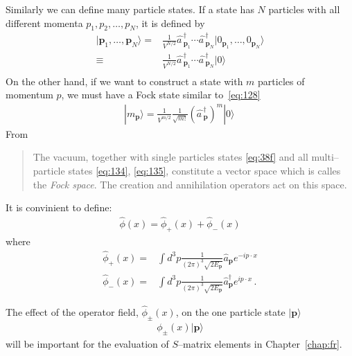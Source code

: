 Similarly we can define many particle states. If a state has $N$ particles with all different momenta $p_1,p_2,\ldots,p_N$, it is defined by
\begin{align}
  \label{eq:134}
  |\mathbf{p}_1,\ldots,\mathbf{p}_N\rangle=&\frac{1}{V^{N/2}}\widehat{a\,}_{\mathbf{p}_1}^\dagger\cdots
\widehat{a\,}_{\mathbf{p}_N}^\dagger|0_{\mathbf{p}_1},\ldots,0_{\mathbf{p}_N}\rangle\nonumber\\
\equiv&\frac{1}{V^{N/2}}\widehat{a\,}_{\mathbf{p}_1}^\dagger\cdots
\widehat{a\,}_{\mathbf{p}_N}^\dagger|0\rangle\nonumber\\
\end{align}
On the other hand, if we want to construct a state with $m$ particles of momentum $p$, we must have a Fock state similar to~\eqref{eq:128}
\begin{align}
\label{eq:135}
  |m_{\mathbf{p}}\rangle=\frac{1}{V^{m/2}}\frac{1}{\sqrt{m!}}\left(\widehat{a\,}_{\mathbf{p}}^\dagger\right)^{m}|0\rangle\,
\end{align}
From\cite{Lahiri:2005sm}
\begin{quote}
  The vacuum, together with single particles states \eqref{eq:38f} and all multi--particle states \eqref{eq:134}, \eqref{eq:135}, constitute a vector space which is calles the \emph{Fock space}. The creation and annihilation operators act on this space.
\end{quote}



It is convinient to define: 
\begin{align}
\label{eq:36}
  \widehat{\phi}(x)=\widehat{\phi}_+(x)+\widehat{\phi}_-(x)
\end{align}
where
\begin{align}
\label{eq:37f}
  \widehat{\phi}_+(x)=&\int d^3p \frac{1}{(2\pi)^3\sqrt{2E_\mathbf{p} }}
  \widehat{a}_\mathbf{p} e^{-i p\cdot x }\nonumber\\
  \widehat{\phi}_-(x)=&\int d^3p \frac{1}{(2\pi)^3\sqrt{2E_\mathbf{p} }}\widehat{a}_\mathbf{p}^\dagger e^{i p\cdot x }\,.
\end{align}

The effect of the operator field, $\widehat{\phi}_\pm(x)$, on the one particle state $|\mathbf{p}\rangle$
\begin{align}
  \phi_\pm(x)|\mathbf{p}\rangle
\end{align}
will be important for the evaluation of $S$--matrix elements in Chapter~\ref{chap:fr}.

